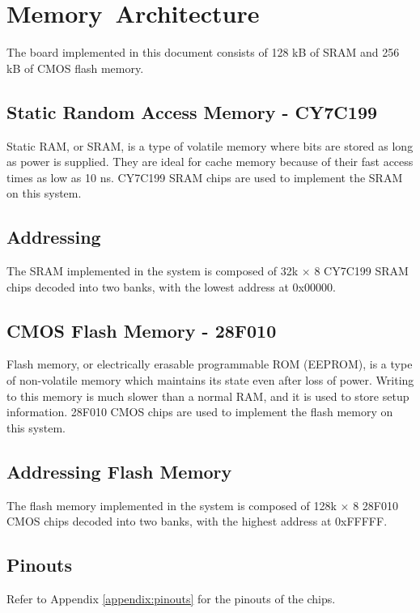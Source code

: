 \section{Memory Architecture}
The board implemented in this document consists of 128 kB of SRAM and 256 kB of CMOS flash memory.

    \subsection{Static Random Access Memory - CY7C199}
    Static RAM, or SRAM, is a type of volatile memory where bits are stored as long as power is supplied. They are ideal for cache memory because of their fast access times as low as 10 ns. CY7C199 SRAM chips are used to implement the SRAM on this system.

    \subsection{Addressing}
    The SRAM implemented in the system is composed of 32k $\times$ 8 CY7C199 SRAM chips decoded into two banks, with the lowest address at 0x00000.

    \subsection{CMOS Flash Memory - 28F010}
    Flash memory, or electrically erasable programmable ROM (EEPROM), is a type of non-volatile memory which maintains its state even after loss of power. Writing to this memory is much slower than a normal RAM, and it is used to store setup information. 28F010 CMOS chips are used to implement the flash memory on this system.

    \subsection{Addressing Flash Memory}
    The flash memory implemented in the system is composed of 128k $\times$ 8 28F010 CMOS chips decoded into two banks, with the highest address at 0xFFFFF.

    \subsection{Pinouts}
    Refer to Appendix \ref{appendix:pinouts} for the pinouts of the chips.
